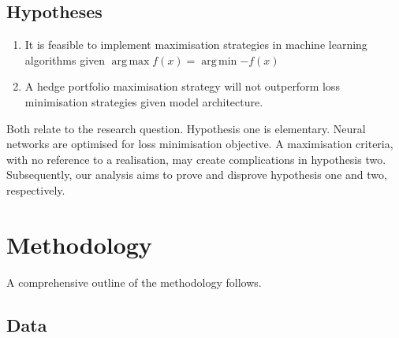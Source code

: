 \documentclass[12pt]{article}
\DeclareMathOperator*{\argmax}{arg\,max}
\DeclareMathOperator*{\argmin}{arg\,min} %
\begin{document}
\subsection{Hypotheses}
\singlespacing
\begin{enumerate}
	\item It is feasible to implement maximisation strategies in machine learning algorithms given $\argmax{f(x)}=\argmin{-f(x)}$
	\item A hedge portfolio maximisation strategy will not outperform loss minimisation strategies given model architecture.
\end{enumerate}
\doublespacing
Both relate to the research question. Hypothesis one is elementary.
Neural networks are optimised for loss minimisation objective. A maximisation criteria, with no reference to a realisation, may create complications in hypothesis two.
Subsequently, our analysis aims to prove and disprove hypothesis one and two, respectively.
\newpage
\section{Methodology} \label{methodlogy}
A comprehensive outline of the methodology follows.
\subsection{Data}\label{data}
\end{document}
